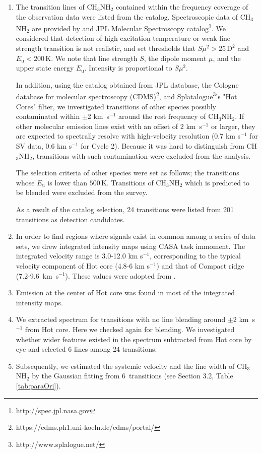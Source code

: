 \begin{enumerate}
\item The transition lines of CH$_3$NH$_2$ contained within the frequency coverage of the observation data were listed from the catalog. Spectroscopic data of CH$_3$NH$_2$ are provided by \citet{Motiyenko+2014} and JPL Molecular Spectroscopy catalog\footnote{http://spec.jpl.nasa.gov}.
We considered that detection of high excitation temperature or weak line strength transition 
is not realistic, and set thresholds that $S\mu^2 > 25\,\mathrm{D^2}$ and $E_{\mathrm{u}} < 200 \,\mathrm{K}$. We note that line strength $S$, the dipole moment $\mu$, and the upper state energy 
$E_{\mathrm{u}}$. Intensity is proportional to $S\mu^2$.

In addition, using the catalog obtained from JPL database, the Cologne database for molecular 
spectroscopy (CDMS)\footnote{https://cdms.ph1.uni-koeln.de/cdms/portal/}, 
and Splatalogue\footnote{http://www.splalogue.net/}'s "Hot Cores" filter, 
we investigated transitions of other species possibly contaminated within $\pm$2 km~s$^{-1}$  
around the rest frequency of CH$_3$NH$_2$. 
If other molecular emission lines exist with an offset of 2 km~s$^{-1}$ or larger, they are expected to spectrally resolve with high-velocity resolution (0.7 km s$^{-1}$ for SV data, 0.6 km s$^{-1}$ for Cycle 2).
Because it was hard to distinguish from CH$_3$NH$_2$, transitions with such contamination were excluded from the analysis.

The selection criteria of other species were set as follows; 
the transitions whose $E_{\mathrm{u}}$ is lower than $500\, \mathrm{K}$.
Transitions of CH$_3$NH$_2$ which is predicted to be blended were excluded from the survey.

As a result of the catalog selection, 24 transitions were listed from 201 transitions as detection candidates.

\item In order to find regions where signals exist in common among a series of data sets, 
we drew integrated intensity maps 
using CASA task {\sc immoment}. The integrated velocity range is 3.0-12.0 km s$^{-1}$, corresponding to
the typical velocity component of Hot core (4.8-6 km s$^{-1}$) and that of Compact ridge 
(7.2-9.6~km~s$^{-1}$). These values were adopted from \citet{Feng+2015}.

\item Emission at the center of Hot core was found in most of the integrated intensity maps. 

\item We extracted spectrum for transitions with no line blending around $\pm$2 km~s$^{-1}$ from Hot core. Here we checked again for blending. We investigated whether wider features existed 
in the spectrum subtracted from Hot core by eye and selected 6 lines among 24 transitions.

\item Subsequently, we estimated the systemic velocity and the line width of CH$_3$NH$_2$ 
by the Gaussian fitting from 6~transitions (see Section 3.2, Table \ref{tab:paraOri}).
\end{enumerate}
